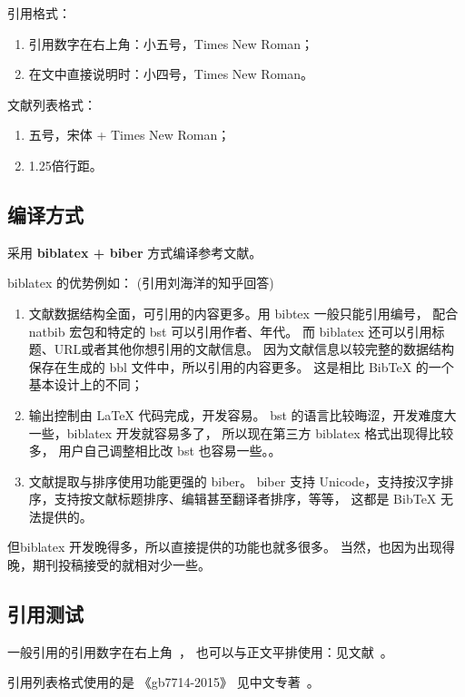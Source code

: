 \documentclass{swputhesis}
\begin{document}
引用格式：

\begin{enumerate}
	\item 引用数字在右上角：小五号，Times New Roman；
	\item 在文中直接说明时：小四号，Times New Roman。
\end{enumerate}

文献列表格式：

\begin{enumerate}
	\item 五号，宋体 + Times New Roman；
	\item 1.25倍行距。
\end{enumerate}

\subsection{编译方式}

采用 \textbf{biblatex + biber} 方式编译参考文献。

biblatex 的优势例如： (引用刘海洋的知乎回答)

\begin{enumerate}
	\item 文献数据结构全面，可引用的内容更多。用 bibtex 一般只能引用编号，
				配合 natbib 宏包和特定的 bst 可以引用作者、年代。
				而 biblatex 还可以引用标题、URL或者其他你想引用的文献信息。
				因为文献信息以较完整的数据结构保存在生成的 bbl 文件中，所以引用的内容更多。
				这是相比 BibTeX 的一个基本设计上的不同；
	\item 输出控制由 LaTeX 代码完成，开发容易。
				bst 的语言比较晦涩，开发难度大一些，biblatex 开发就容易多了，
				所以现在第三方 biblatex 格式出现得比较多，
				用户自己调整相比改 bst 也容易一些。。
	\item 文献提取与排序使用功能更强的 biber。
				biber 支持 Unicode，支持按汉字排序，支持按文献标题排序、编辑甚至翻译者排序，等等，
				这都是 BibTeX 无法提供的。
\end{enumerate}

但biblatex 开发晚得多，所以直接提供的功能也就多很多。
当然，也因为出现得晚，期刊投稿接受的就相对少一些。

\subsection{引用测试}

一般引用的引用数字在右上角~\cite{knuth1984}，
也可以与正文平排使用：见文献~\parencite{knuth1986}。

引用列表格式使用的是 《gb7714-2015》
见中文专著~\cite{liu2013}。

\printbibliography[heading=bibintoc]
\end{document}
